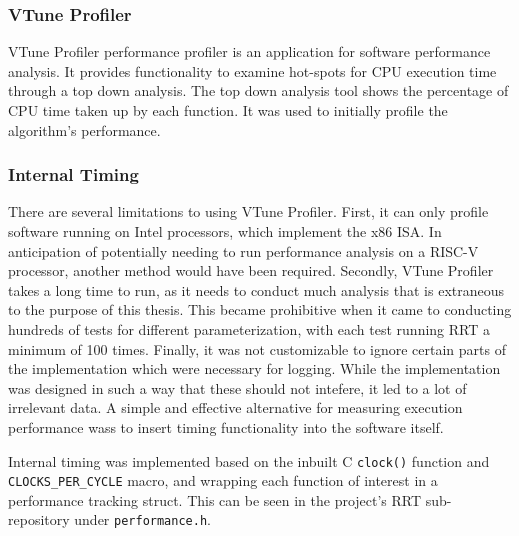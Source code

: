 
\subsubsection*{VTune Profiler}
    VTune Profiler performance profiler is an application for software performance analysis. It provides functionality to examine hot-spots for CPU execution time through a top down analysis. The top down analysis tool shows the percentage of CPU time taken up by each function. It was used to initially profile the algorithm's performance.

    \subsubsection{Internal Timing}
        There are several limitations to using VTune Profiler. First, it can only profile software running on Intel processors, which implement the x86 \gls{ISA}. In anticipation of potentially needing to run performance analysis on a \gls{RISC-V} processor, another method would have been required. Secondly, VTune Profiler takes a long time to run, as it needs to conduct much analysis that is extraneous to the purpose of this thesis. This became prohibitive when it came to conducting hundreds of tests for different parameterization, with each test running \gls{RRT} a minimum of 100 times. Finally, it was not customizable to ignore certain parts of the implementation which were necessary for logging. While the implementation was designed in such a way that these should not intefere, it led to a lot of irrelevant data. A simple and effective alternative for measuring execution performance wass to insert timing functionality into the software itself.

        Internal timing was implemented based on the inbuilt C \texttt{clock()} function and \\ \texttt{CLOCKS\_PER\_CYCLE} macro, and wrapping each function of interest in a performance tracking struct. This can be seen in the project's \gls{RRT} sub-repository under \texttt{performance.h}.

